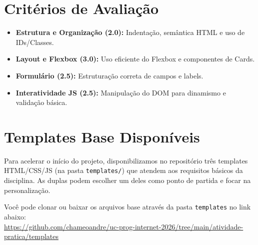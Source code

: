 \documentclass[12pt,a4paper]{article}
\begin{document}
\section{Critérios de Avaliação}
\begin{boxAtividade}
\begin{itemize}
    \item \textbf{Estrutura e Organização (2.0):} Indentação, semântica HTML e uso de IDs/Classes.
    \item \textbf{Layout e Flexbox (3.0):} Uso eficiente do Flexbox e componentes de Cards.
    \item \textbf{Formulário (2.5):} Estruturação correta de campos e labels.
    \item \textbf{Interatividade JS (2.5):} Manipulação do DOM para dinamismo e validação básica.
\end{itemize}
\end{boxAtividade}

\newpage
\section{Templates Base Disponíveis}
Para acelerar o início do projeto, disponibilizamos no repositório três templates HTML/CSS/JS (na pasta \texttt{templates/}) que atendem aos requisitos básicos da disciplina. As duplas podem escolher um deles como ponto de partida e focar na personalização.

\vspace{0.3cm}
\begin{tcolorbox}[colback=yellow!10, colframe=yellow!50!black, title=\textbf{Acesso ao Repositório (GitHub)}]
    Você pode clonar ou baixar os arquivos base através da pasta \texttt{templates} no link abaixo:\\
    \url{https://github.com/chameoandre/uc-prog-internet-2026/tree/main/atividade-pratica/templates}
\end{tcolorbox}
\vspace{0.3cm}
\end{document}
